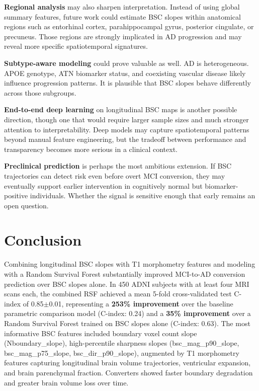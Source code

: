 \documentclass[blue]{ludusofficial}
\begin{document}
\textbf{Regional analysis} may also sharpen interpretation. Instead of using global summary features, future work could estimate BSC slopes within anatomical regions such as entorhinal cortex, parahippocampal gyrus, posterior cingulate, or precuneus. Those regions are strongly implicated in AD progression and may reveal more specific spatiotemporal signatures.

\textbf{Subtype-aware modeling} could prove valuable as well. AD is heterogeneous. APOE genotype, ATN biomarker status, and coexisting vascular disease likely influence progression patterns. It is plausible that BSC slopes behave differently across those subgroups.

\textbf{End-to-end deep learning} on longitudinal BSC maps is another possible direction, though one that would require larger sample sizes and much stronger attention to interpretability. Deep models may capture spatiotemporal patterns beyond manual feature engineering, but the tradeoff between performance and transparency becomes more serious in a clinical context.

\textbf{Preclinical prediction} is perhaps the most ambitious extension. If BSC trajectories can detect risk even before overt MCI conversion, they may eventually support earlier intervention in cognitively normal but biomarker-positive individuals. Whether the signal is sensitive enough that early remains an open question.

\section{Conclusion}

Combining longitudinal BSC slopes with T1 morphometry features and modeling with a Random Survival Forest substantially improved MCI-to-AD conversion prediction over BSC slopes alone. In 450 ADNI subjects with at least four MRI scans each, the combined RSF achieved a mean 5-fold cross-validated test C-index of 0.85$\pm$0.01, representing a \textbf{253\% improvement} over the baseline parametric comparison model (C-index: 0.24) and a \textbf{35\% improvement} over a Random Survival Forest trained on BSC slopes alone (C-index: 0.63). The most informative BSC features included boundary voxel count slope (Nboundary\_slope), high-percentile sharpness slopes (bsc\_mag\_p90\_slope, bsc\_mag\_p75\_slope, bsc\_dir\_p90\_slope), augmented by T1 morphometry features capturing longitudinal brain volume trajectories, ventricular expansion, and brain parenchymal fraction. Converters showed faster boundary degradation and greater brain volume loss over time.
\end{document}
